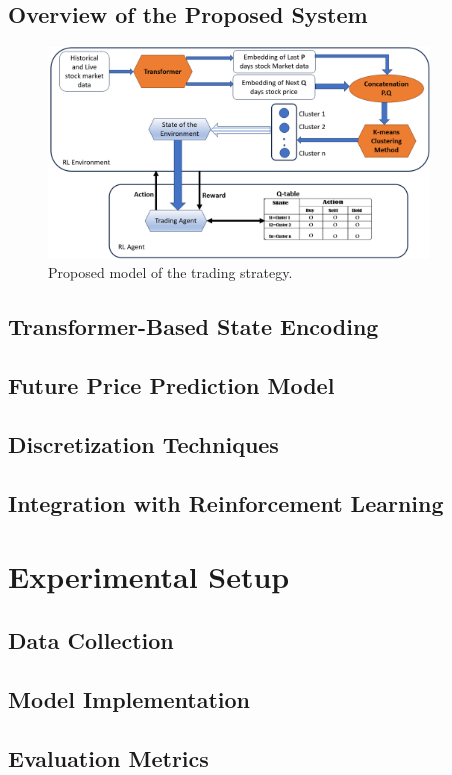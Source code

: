 \documentclass[preprint,review,12pt]{elsarticle}
\begin{document}
\subsection{Overview of the Proposed System}
	\begin{figure}[h]
		\centering
		\includegraphics[width=0.9\textwidth, height=0.6\textheight]{Pmodel.png}
		\caption{Proposed model of the trading strategy.}
		\label{fig1l}
	\end{figure}

\subsection{ Transformer-Based State Encoding}
\subsection{Future Price Prediction Model}
\subsection{Discretization Techniques}
\subsection{Integration with Reinforcement Learning}
\section{Experimental Setup}
\subsection{Data Collection}
\subsection{Model Implementation}
\subsection{Evaluation Metrics}
\end{document}

